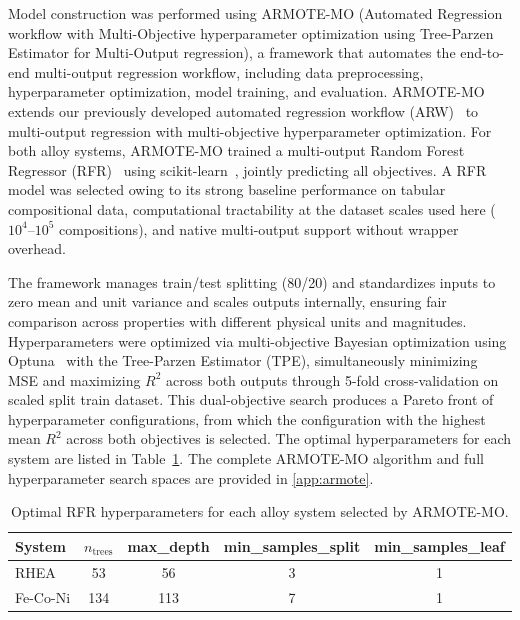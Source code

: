 Model construction was performed using ARMOTE-MO (Automated Regression workflow with Multi-Objective hyperparameter optimization using Tree-Parzen Estimator for Multi-Output regression), a framework that automates the end-to-end multi-output regression workflow, including data preprocessing, hyperparameter optimization, model training, and evaluation. ARMOTE-MO extends our previously developed automated regression workflow (ARW)~\cite{padhy2025automated,saurabh2026automated} to multi-output regression with multi-objective hyperparameter optimization. For both alloy systems, ARMOTE-MO trained a multi-output Random Forest Regressor (RFR)~\cite{Breiman2001} using scikit-learn~\cite{Pedregosa2011}, jointly predicting all objectives. A RFR model was selected owing to its strong baseline performance on tabular compositional data, computational tractability at the dataset scales used here ($10^4$--$10^5$ compositions), and native multi-output support without wrapper overhead. 

The framework manages train/test splitting (80/20) and standardizes inputs to zero mean and unit variance and scales outputs internally, ensuring fair comparison across properties with different physical units and magnitudes. Hyperparameters were optimized via multi-objective Bayesian optimization using Optuna~\cite{Akiba2019} with the Tree-Parzen Estimator (TPE), simultaneously minimizing MSE and maximizing $R^2$ across both outputs through 5-fold cross-validation on scaled split train dataset. This dual-objective search produces a Pareto front of hyperparameter configurations, from which the configuration with the highest mean $R^2$ across both objectives is selected.
The optimal hyperparameters for each system are listed in Table~\ref{tab:rfr-hyperparameters}. The complete ARMOTE-MO algorithm and full hyperparameter search spaces are provided in \ref{app:armote}.

\begin{table}[h]
\centering
\begin{tabular}{lcccc}
\toprule
System & $n_\text{trees}$ & max\_depth & min\_samples\_split & min\_samples\_leaf \\
\midrule
RHEA & 53 & 56 & 3 & 1 \\
Fe-Co-Ni        & 134 & 113 & 7 & 1 \\
\bottomrule
\end{tabular}
\caption{Optimal RFR hyperparameters for each alloy system selected by ARMOTE-MO.}
\label{tab:rfr-hyperparameters}
\end{table}

